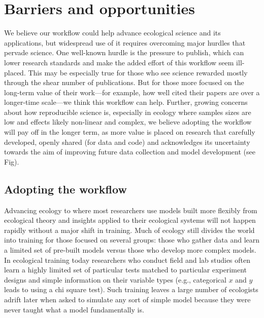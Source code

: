 \documentclass[11pt]{article}
\begin{document}
\section{Barriers and opportunities}

We believe our workflow could help advance ecological science and its applications, but widespread use of it requires overcoming major hurdles that pervade science.  
One well-known hurdle is the pressure to publish, which can lower research standards and make the added effort of this workflow seem ill-placed. This may be especially true for those who see science rewarded mostly through the shear number of publications. But for those more focused on the long-term value of their work---for example, how well cited their papers are over a longer-time scale---we think this workflow can help. %
Further, growing concerns about how reproducible science is, especially in ecology where samples sizes are low and effects likely non-linear and complex, we believe adopting the workflow will pay off in the longer term, as more value is placed on research that carefully developed, openly shared (for data and code) and acknowledges its uncertainty towards the aim of improving future data collection and model development (see Fig). 

\subsection{Adopting the workflow}
Advancing ecology to where most researchers use models built more flexibly from ecological theory and insights applied to their ecological systems will not happen rapidly without a major shift in training. Much of ecology still divides the world into training for those focused on several groups: those who gather data and learn a limited set of pre-built models versus those who develop more complex models. In ecological training today researchers who conduct field and lab studies often learn a highly limited set of particular tests matched to particular experiment designs and simple information on their variable types (e.g., categorical $x$ and $y$ leads to using a chi square test). Such training leaves a large number of ecologists adrift later when asked to simulate any sort of simple model because they were never taught what a model fundamentally is. %
\end{document}

